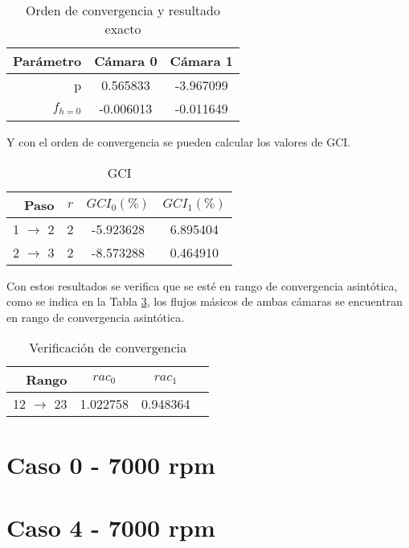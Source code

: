 \begin{table}
    \centering
    \begin{tabular}{rcc}\toprule
        Parámetro & Cámara 0  & Cámara 1  \\ \midrule
        p         &  0.565833 & -3.967099 \\
        $f_{h=0}$ & -0.006013 & -0.011649 \\ \bottomrule
    \end{tabular}
    \caption{Orden de convergencia y resultado exacto}
    \label{tab:res1_caso0}
\end{table}

Y con el orden de convergencia se pueden calcular los valores de GCI.

\begin{table}
    \centering
    \begin{tabular}{rccc}\toprule
        Paso              & $r$ & $GCI_0(\%)$ & $GCI_1(\%)$ \\ \midrule
        1 $\rightarrow$ 2 & 2   & -5.923628   & 6.895404 \\
        2 $\rightarrow$ 3 & 2   & -8.573288   & 0.464910 \\ \bottomrule
    \end{tabular}
    \caption{GCI}
    \label{tab:gci_caso_0}
\end{table}

Con estos resultados se verifica que se esté en rango de convergencia
asintótica, como se indica en la Tabla \ref{tab:rac_caso_0}, los flujos
másicos de ambas cámaras se encuentran en rango de convergencia asintótica.

\begin{table}
    \centering
    \begin{tabular}{rccc}\toprule
        Rango               & $rac_0$  & $rac_1$ \\ \midrule
        12 $\rightarrow$ 23 & 1.022758 & 0.948364 \\ \bottomrule
    \end{tabular}
    \caption{Verificación de convergencia}
    \label{tab:rac_caso_0}
\end{table}


\section{Caso 0 - 7000 rpm}

\section{Caso 4 - 7000 rpm}

